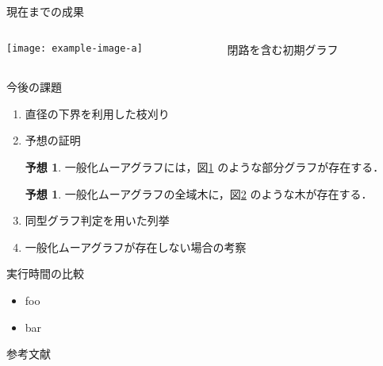\documentclass[dvipdfmx]{beamer}
\theoremstyle{definition}
\newtheorem{conjecture}[theorem]{予想}
\begin{document}
\begin{frame}{現在までの成果}
  \begin{columns}
    \begin{column}{.6\textwidth}
      \centering
      \texttt{[image: example-image-a]}
      \label{fig:result}
    \end{column}
    \begin{column}{.4\textwidth}
      \centering
      \begin{figure}
        \centering
        \def\svgwidth{\textwidth}
        \resizebox{!}{.3\textheight}{
          
        }
        \caption{閉路を含む初期グラフ}
        \label{fig:initial-graph-cycle}
      \end{figure}
      \vspace{-2em}
      \begin{figure}
        \def\svgwidth{\textwidth}
        \resizebox{!}{.3\textheight}{
          
        }
        \label{fig:initial-graph-stree}
      \end{figure}
    \end{column}
  \end{columns}
\end{frame}

\begin{frame}{今後の課題}
  \begin{enumerate}
  \item 直径の下界を利用した枝刈り
  \item 予想の証明
    \begin{conjecture}
      一般化ムーアグラフには，図\ref{fig:initial-graph-cycle}
      のような部分グラフが存在する．
    \end{conjecture}
    \begin{conjecture}
      一般化ムーアグラフの全域木に，図\ref{fig:initial-graph-stree}
      のような木が存在する．
    \end{conjecture}
  \item 同型グラフ判定を用いた列挙
  \item 一般化ムーアグラフが存在しない場合の考察
  \end{enumerate}
\end{frame}

\appendix
\begin{frame}{実行時間の比較}
  \begin{itemize}
  \item foo
  \item bar
  \end{itemize}
\end{frame}

\begin{frame}[allowframebreaks]{参考文献}
  
  
\end{frame}
\end{document}
